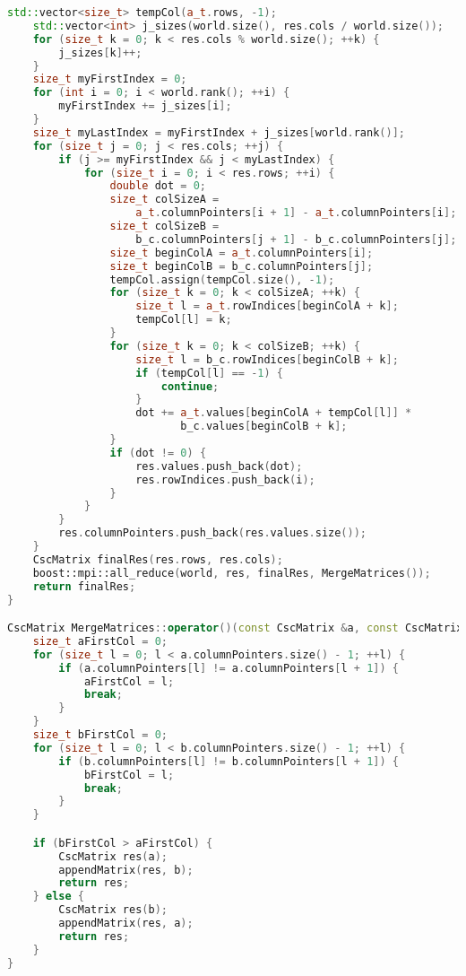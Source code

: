 \documentclass[a4paper,12pt]{article}
\begin{document}
\begin{lstlisting}[language=C++]
    std::vector<size_t> tempCol(a_t.rows, -1);
    std::vector<int> j_sizes(world.size(), res.cols / world.size());
    for (size_t k = 0; k < res.cols % world.size(); ++k) {
        j_sizes[k]++;
    }
    size_t myFirstIndex = 0;
    for (int i = 0; i < world.rank(); ++i) {
        myFirstIndex += j_sizes[i];
    }
    size_t myLastIndex = myFirstIndex + j_sizes[world.rank()];
    for (size_t j = 0; j < res.cols; ++j) {
        if (j >= myFirstIndex && j < myLastIndex) {
            for (size_t i = 0; i < res.rows; ++i) {
                double dot = 0;
                size_t colSizeA =
                    a_t.columnPointers[i + 1] - a_t.columnPointers[i];
                size_t colSizeB =
                    b_c.columnPointers[j + 1] - b_c.columnPointers[j];
                size_t beginColA = a_t.columnPointers[i];
                size_t beginColB = b_c.columnPointers[j];
                tempCol.assign(tempCol.size(), -1);
                for (size_t k = 0; k < colSizeA; ++k) {
                    size_t l = a_t.rowIndices[beginColA + k];
                    tempCol[l] = k;
                }
                for (size_t k = 0; k < colSizeB; ++k) {
                    size_t l = b_c.rowIndices[beginColB + k];
                    if (tempCol[l] == -1) {
                        continue;
                    }
                    dot += a_t.values[beginColA + tempCol[l]] *
                           b_c.values[beginColB + k];
                }
                if (dot != 0) {
                    res.values.push_back(dot);
                    res.rowIndices.push_back(i);
                }
            }
        }
        res.columnPointers.push_back(res.values.size());
    }
    CscMatrix finalRes(res.rows, res.cols);
    boost::mpi::all_reduce(world, res, finalRes, MergeMatrices());
    return finalRes;
}

CscMatrix MergeMatrices::operator()(const CscMatrix &a, const CscMatrix &b) {
    size_t aFirstCol = 0;
    for (size_t l = 0; l < a.columnPointers.size() - 1; ++l) {
        if (a.columnPointers[l] != a.columnPointers[l + 1]) {
            aFirstCol = l;
            break;
        }
    }
    size_t bFirstCol = 0;
    for (size_t l = 0; l < b.columnPointers.size() - 1; ++l) {
        if (b.columnPointers[l] != b.columnPointers[l + 1]) {
            bFirstCol = l;
            break;
        }
    }

    if (bFirstCol > aFirstCol) {
        CscMatrix res(a);
        appendMatrix(res, b);
        return res;
    } else {
        CscMatrix res(b);
        appendMatrix(res, a);
        return res;
    }
}


\end{lstlisting}
\end{document}
